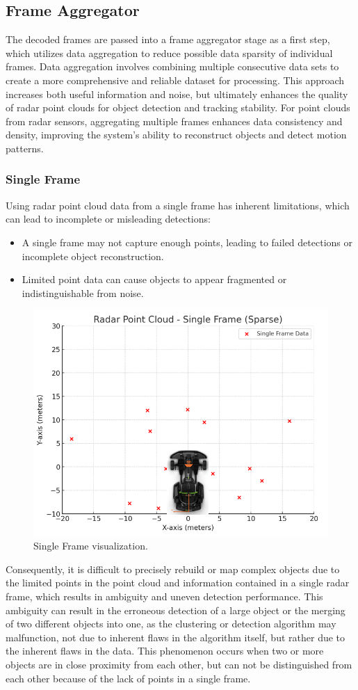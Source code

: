
\subsection{Frame Aggregator}
\label{sec:Frame Aggregator}
The decoded frames are passed into a frame aggregator stage as a first step, which utilizes data aggregation to reduce possible data sparsity of individual frames. 
Data aggregation involves combining multiple consecutive data sets to create a more comprehensive and reliable dataset for processing. This approach increases both useful information and noise, but ultimately enhances the quality of radar point clouds for object detection and tracking stability.
For point clouds from radar sensors, aggregating multiple frames enhances data consistency and density, improving the system’s ability to reconstruct objects and detect motion patterns.

\subsubsection{Single Frame}
Using radar point cloud data from a single frame has inherent limitations, which can lead to incomplete or misleading detections:
\begin{itemize}
    \item A single frame may not capture enough points, leading to failed detections or incomplete object reconstruction.
    \item Limited point data can cause objects to appear fragmented or indistinguishable from noise.
\end{itemize}

\begin{figure}[!htbp]
    \centering
    \includegraphics[width=0.5\linewidth]{images/singleframe.png}
    \caption{Single Frame visualization.}
    \label{fig: Single Frame visualization}
\end{figure}

Consequently, it is difficult to precisely rebuild or map complex objects due to the limited points in the point cloud and information contained in a single radar frame, which results in ambiguity and uneven detection performance.
This ambiguity can result in the erroneous detection of a large object or the merging of two different objects into one, as the clustering or detection algorithm may malfunction, not due to inherent flaws in the algorithm itself, but rather due to the inherent flaws in the data. This phenomenon occurs when two or more objects are in close proximity from each other, but can not be distinguished from each other because of the lack of points in a single frame.


